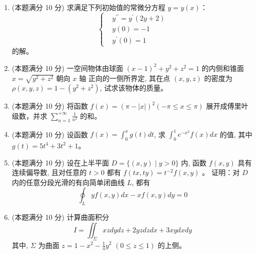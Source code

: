 \begin{enumerate}
\item 
(本题满分 10 分)
求满足下列初始值的常微分方程 $y=y(x)$： 
\[
\left\{\begin{aligned}
	&y^{\prime \prime}=y^{\prime}(2 y+2) \\
	&y(0)=-1 \\
	&y^{\prime}(0)=1
\end{aligned}\right.
\]
的解。



\item 
(本题满分 10 分)
一空间物体由球面 $(x-1)^{2}+y^{2}+z^{2}=1$ 的内侧和锥面 $x=\sqrt{y^{2}+z^{2}}$ 朝向 $x$ 轴 正向的一侧所界定, 其在点 $(x, y, z)$ 的密度为 $\rho(x, y, z)=1-\left(y^{2}+z^{2}\right)$, 试求该物体的质量。



\item 
(本题满分 10 分)
将函数 $f(x)=(\pi-|x|)^{2}(-\pi \leqslant x \leqslant \pi)$ 展开成傅里叶级数，并求 $\sum\limits_{n=1}^{+\infty} \frac{1}{n^{2}}$ 的和。



\item 
(本题满分 10 分)
设函数 $f(x)=\int_{0}^{x} g(t) d t$, 求 $\int_{0}^{1} e^{-x^{2}} f(x) d x$ 的值, 其中 $g(t)=5 t^{4}+3 t^{2}+1$。



\newpage
\item 
(本题满分 10 分)
设在上半平面 $D=\{(x, y) \mid y>0\}$ 内, 函数 $f(x, y)$ 具有连续偏导数, 且对任意的 $t>0$ 都有 $f(t x, t y)=t^{-2} f(x, y)$ 。 证明：对 $D$ 内的任意分段光滑的有向简单闭曲线 $L$, 都有
\[
\oint_{L} y f(x, y) d x-x f(x, y) d y=0
\]



\item 
(本题满分 10 分)
计算曲面积分
\[
I=\iint_{\Sigma} x z d y d z+2 y z d z d x+3 x y d x d y
\]
其中, $\Sigma$ 为曲面 $z=1-x^{2}-\frac{1}{4} y^{2}$ $(0 \leqslant z \leqslant 1)$ 的上侧。


\end{enumerate}
